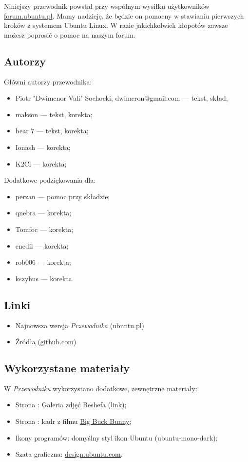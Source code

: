 Niniejszy przewodnik powstał przy wspólnym wysiłku użytkowników \href{http://ubuntu.pl/forum/}{forum.ubuntu.pl}. Mamy nadzieję, że będzie on pomocny w stawianiu pierwszych kroków z systemem Ubuntu Linux. W razie jakichkolwiek kłopotów zawsze możesz poprosić o pomoc na naszym forum.

\subsection{Autorzy}
Główni autorzy przewodnika:
\begin{itemize}
\item Piotr "Dwimenor Vali" Sochocki, dwimeron@gmail.com --- tekst, skład;
\item makson --- tekst, korekta;
\item bear 7 --- tekst, korekta;
\item Ionash --- korekta;
\item K2Cl --- korekta;
\end{itemize}

Dodatkowe podziękowania dla:
\begin{itemize}
\item perzan --- pomoc przy składzie;
\item qnebra --- korekta;
\item Tomfoc  --- korekta;
\item enedil --- korekta;
\item rob006 --- korekta;
\item kszyhus --- korekta.
\end{itemize}

\subsection{Linki}
\begin{itemize}
\item Najnowsza wersja \textit{Przewodnika} (ubuntu.pl)
\item \href{https://github.com/Dwimenor/Przewodnik-Ubuntu-14.04-LTS-Trusty-Tahr}{Źródła} (github.com)
\end{itemize}

\subsection{Wykorzystane materiały}
W \textit{Przewodniku} wykorzystano dodatkowe, zewnętrzne materiały:
\begin{itemize}
\item Strona \pageref{shotwell}: Galeria zdjęć Beshefa (\href{https://www.flickr.com/photos/sharif/sets/72157600223985436/}{link});
\item Strona \pageref{totem}: kadr z filmu \href{http://www.bigbuckbunny.org}{Big Buck Bunny};
\item Ikony programów: domyślny styl ikon Ubuntu (ubuntu-mono-dark);
\item Szata graficzna: \href{http://design.ubuntu.com/}{design.ubuntu.com}.
\end{itemize}

